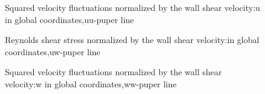 \begin{figure}[H]
\centering
 \caption{Squared velocity fluctuations normalized by the wall shear velocity:u in global coordinates,uu-puper line}
\label{pd}
\end{figure}

\begin{figure}[H]
\centering
 \caption{Reynolds shear stress normalized by the wall shear velocity:in global coordinates,uw-puper line}
\label{pd}
\end{figure}

\begin{figure}[H]
\centering
 \caption{Squared velocity fluctuations normalized by the wall shear velocity:w in global coordinates,ww-puper line}
\label{pd}
\end{figure}

\vfill




